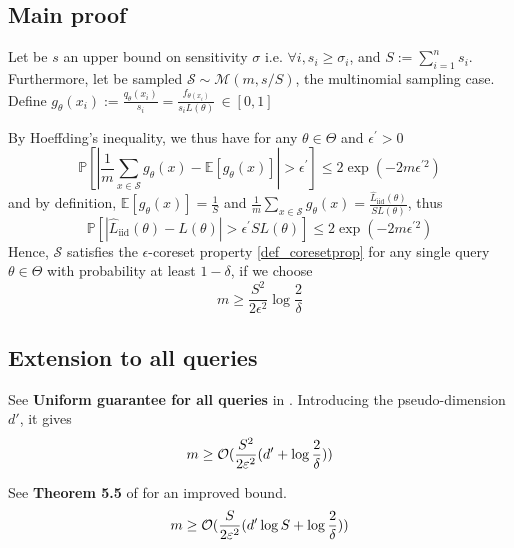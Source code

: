 \subsection{Main proof}
Let be $s$ an upper bound on sensitivity $\sigma$ i.e. $\forall i, s_i \geq \sigma_i$, and $S := \sum_{i=1}^n s_i$. Furthermore, let be sampled  $\mathcal S \sim \mathcal M(m, s/S)$, the multinomial sampling case. Define $g_\theta(x_i) := \frac{q_\theta(x_i)}{s_i} = \frac{f_{\theta(x_i)}}{s_i L(\theta)}  \, \in[0,1]$

By Hoeffding's inequality, we thus have for any $\theta \in \Theta$ and $\epsilon^{\prime}>0$
\begin{equation}
	\mathbb{P}\left[\left|\frac{1}{m} \sum_{x \in \mathcal{S}} g_{\theta}(x) - \mathbb{E}\left[g_{\theta}(x)\right]\right|>\epsilon^{\prime}\right] \leq 2 \exp \left(-2 m \epsilon^{\prime 2}\right)
\end{equation}
and by definition, $\mathbb{E}\left[g_{\theta}(x)\right]=\frac{1}{S}$ and $\frac{1}{m} \sum_{x \in \mathcal{S}} g_{\theta}(x)=\frac{\hat L_{\textrm{iid}}(\theta)}{S L(\theta)}$, thus
\begin{equation*}
	\mathbb{P}\left[|\hat L_{\textrm{iid}}(\theta) - L(\theta)|>\epsilon^{\prime} S L(\theta)\right] \leq 2 \exp \left(-2 m \epsilon^{\prime 2}\right)
\end{equation*}
Hence, $\mathcal{S}$ satisfies the $\epsilon$-coreset property \ref{def_coresetprop} for any single query $\theta \in \Theta$ with probability at least $1-\delta$, if we choose
\begin{equation}
	m \geq \frac{S^{2}}{2 \epsilon^{2}} \log \frac{2}{\delta}
\end{equation}


\subsection{Extension to all queries}
See \textbf{Uniform guarantee for all queries} in \cite{bachem2017coresetML}. Introducing the pseudo-dimension $d'$, it gives
\begin{equation}
	m \geq \mathcal{O}(\frac{S^{2}}{2 \varepsilon^{2}} (d' + \log \frac{2}{\delta}))
\end{equation}

See \textbf{Theorem 5.5} of \cite{braverman2016coresetsota} for an improved bound.
\begin{equation}
	m \geq \mathcal{O}(\frac{S}{2 \varepsilon^{2}} (d' \log S + \log \frac{2}{\delta}))
\end{equation}




